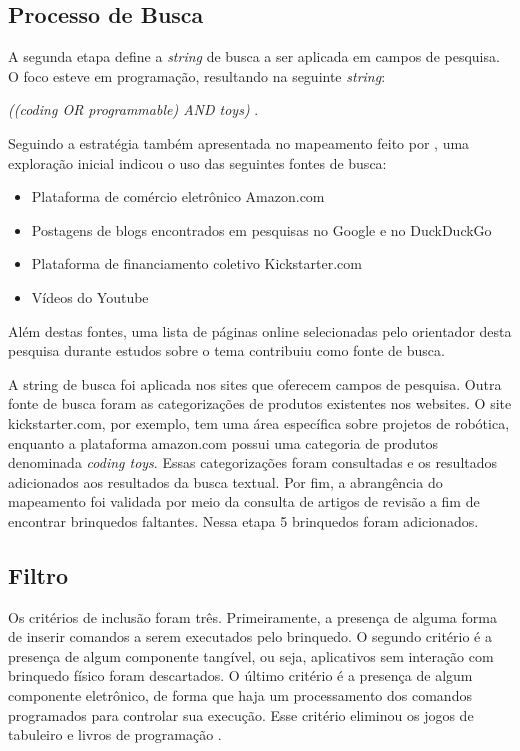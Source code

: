 {\subsection{Processo de Busca}
A segunda etapa define a \textit{string} de busca a ser aplicada em campos de pesquisa. O foco esteve em programação, resultando na seguinte \textit{string}:

\textit{ ((coding OR programmable) AND toys) }.

Seguindo a estratégia também apresentada no mapeamento feito por , uma exploração inicial indicou o uso das seguintes fontes de busca:

\begin{itemize}
    \item Plataforma de comércio eletrônico Amazon.com
    \item Postagens de blogs encontrados em pesquisas no Google e no DuckDuckGo
    \item Plataforma de financiamento coletivo Kickstarter.com
    \item Vídeos do Youtube
\end{itemize}

Além destas fontes, uma lista de páginas online selecionadas pelo orientador desta pesquisa durante estudos sobre o tema contribuiu como fonte de busca.

A string de busca foi aplicada nos sites que oferecem campos de pesquisa. Outra fonte de busca foram as categorizações de produtos existentes nos websites. O site kickstarter.com, por exemplo, tem uma área específica sobre projetos de robótica, enquanto a plataforma amazon.com possui uma categoria de produtos denominada \textit{coding toys}. Essas categorizações foram consultadas e os resultados adicionados aos resultados da busca textual. Por fim, a abrangência do mapeamento foi validada por meio da consulta de artigos de revisão a fim de encontrar brinquedos faltantes. Nessa etapa 5 brinquedos foram adicionados.

\subsection{Filtro}
Os critérios de inclusão foram três. Primeiramente, a presença de alguma forma de inserir comandos a serem executados pelo brinquedo. O segundo critério é a presença de algum componente tangível, ou seja, aplicativos sem interação com brinquedo físico foram descartados. O último critério é a presença de algum componente eletrônico, de forma que haja um processamento dos comandos programados para controlar sua execução. Esse critério eliminou os jogos de tabuleiro e livros de programação \cite{hamilton_emerging_2020}.

}
